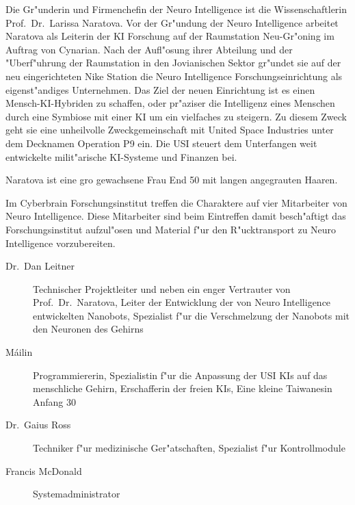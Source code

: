 \renewcommand{\ml}{\pinyin{Mailin2}}


Die Gr"underin und Firmenchefin der Neuro Intelligence ist die Wissenschaftlerin Prof.~Dr.~Larissa Naratova. Vor der Gr"undung der Neuro Intelligence arbeitet Naratova als Leiterin der KI Forschung auf der Raumstation Neu-Gr"oning im Auftrag von Cynarian. Nach der Aufl"osung ihrer Abteilung und der "Uberf"uhrung der Raumstation in den Jovianischen Sektor gr"undet sie auf der neu eingerichteten Nike Station die Neuro Intelligence Forschungseinrichtung als eigenst"andiges Unternehmen. Das Ziel der neuen Einrichtung ist es einen Mensch-KI-Hybriden zu schaffen, oder pr"aziser die Intelligenz eines Menschen durch eine Symbiose mit einer KI um ein vielfaches zu steigern. Zu diesem Zweck  geht sie eine unheilvolle Zweckgemeinschaft mit United Space Industries unter dem Decknamen Operation P9 ein. Die USI steuert dem Unterfangen weit entwickelte milit"arische KI-Systeme und Finanzen bei.

Naratova ist eine gro\3 gewachsene Frau End 50 mit langen angegrauten Haaren. 


Im Cyberbrain Forschungsinstitut treffen die Charaktere auf vier Mitarbeiter von Neuro Intelligence. Diese Mitarbeiter sind beim Eintreffen damit besch"aftigt das Forschungsinstitut aufzul"osen und Material f"ur den R"ucktransport zu Neuro Intelligence vorzubereiten.

\begin{description}
    \item[Dr.~Dan Leitner] Technischer Projektleiter und neben \ml{} ein enger Vertrauter von Prof.~Dr.~Naratova, Leiter der Entwicklung 
        der von Neuro Intelligence entwickelten Nanobots, Spezialist f"ur die Verschmelzung  der  Nanobots mit den Neuronen des Gehirns
    \item[M\'{a}ilin] Programmiererin, Spezialistin f"ur die Anpassung der USI KIs auf das menschliche Gehirn, Erschafferin der freien KIs, 
        Eine kleine Taiwanesin Anfang 30
    \item[Dr.~Gaius Ross] Techniker f"ur medizinische Ger"atschaften, Spezialist f"ur Kontrollmodule
    \item[Francis McDonald] Systemadministrator
\end{description}
\vfill\newpage

